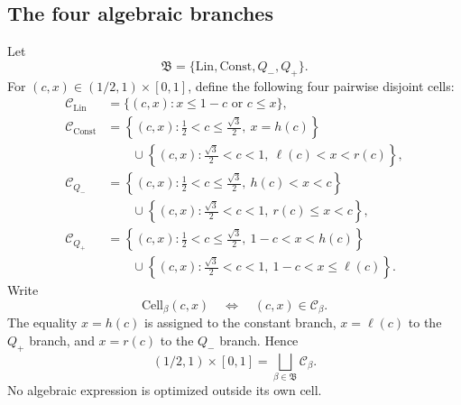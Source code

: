 \subsection{The four algebraic branches}

Let
\[
 \mathfrak B=\{\mathrm{Lin},\mathrm{Const},Q_-,Q_+\}.
\]
For \((c,x)\in(1/2,1)\times[0,1]\), define the following four pairwise
disjoint cells:
\[
 \begin{aligned}
 \mathcal C_{\mathrm{Lin}}
 &=\{(c,x):x\le1-c\text{ or }c\le x\},\\
 \mathcal C_{\mathrm{Const}}
 &=\left\{(c,x):
 \frac12<c\le\frac{\sqrt3}{2},\ x=h(c)\right\}\\
 &\qquad{}\cup
 \left\{(c,x):
 \frac{\sqrt3}{2}<c<1,\ \ell(c)<x<r(c)\right\},\\
 \mathcal C_{Q_-}
 &=\left\{(c,x):
 \frac12<c\le\frac{\sqrt3}{2},\ h(c)<x<c\right\}\\
 &\qquad{}\cup
 \left\{(c,x):
 \frac{\sqrt3}{2}<c<1,\ r(c)\le x<c\right\},\\
 \mathcal C_{Q_+}
 &=\left\{(c,x):
 \frac12<c\le\frac{\sqrt3}{2},\ 1-c<x<h(c)\right\}\\
 &\qquad{}\cup
 \left\{(c,x):
 \frac{\sqrt3}{2}<c<1,\ 1-c<x\le\ell(c)\right\}.
 \end{aligned}
\]
Write
\[
 \mathrm{Cell}_{\beta}(c,x)
 \quad\Longleftrightarrow\quad
 (c,x)\in\mathcal C_\beta.
\]
The equality \(x=h(c)\) is assigned to the constant branch,
\(x=\ell(c)\) to the \(Q_+\) branch, and \(x=r(c)\) to the \(Q_-\) branch.
Hence
\[
 (1/2,1)\times[0,1]
 =
 \bigsqcup_{\beta\in\mathfrak B}\mathcal C_\beta.
\]
No algebraic expression is optimized outside its own cell.
